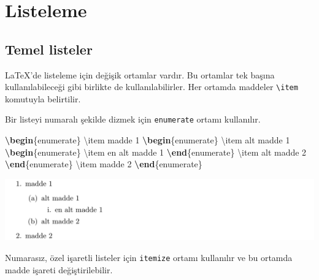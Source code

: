 \documentclass[
  10pt,
]{scrbook}
\newenvironment{Shaded}{}{}
\newcommand{\ExtensionTok}[1]{#1}
\newcommand{\FunctionTok}[1]{\textcolor[rgb]{0.02,0.16,0.49}{#1}}
\newcommand{\KeywordTok}[1]{\textcolor[rgb]{0.00,0.44,0.13}{\textbf{#1}}}
\newcommand{\NormalTok}[1]{#1}
\theoremstyle{definition}
\theoremstyle{definition}
\theoremstyle{definition}
\theoremstyle{definition}
\theoremstyle{remark}
\begin{document}
\hypertarget{listeleme}{%
\section{Listeleme}\label{listeleme}}

\hypertarget{temel-listeler}{%
\subsection{Temel listeler}\label{temel-listeler}}

LaTeX'de listeleme için değişik ortamlar vardır. Bu ortamlar tek başına kullanılabileceği gibi birlikte de kullanılabilirler. Her ortamda maddeler \texttt{\textbackslash{}item} komutuyla belirtilir.

Bir listeyi numaralı şekilde dizmek için \texttt{enumerate} ortamı kullanılır.

\begin{Shaded}
\begin{Highlighting}[]
\KeywordTok{\textbackslash{}begin}\NormalTok{\{}\ExtensionTok{enumerate}\NormalTok{\}}
 \FunctionTok{\textbackslash{}item}\NormalTok{ madde 1}
  \KeywordTok{\textbackslash{}begin}\NormalTok{\{}\ExtensionTok{enumerate}\NormalTok{\}}
    \FunctionTok{\textbackslash{}item}\NormalTok{ alt madde 1}
      \KeywordTok{\textbackslash{}begin}\NormalTok{\{}\ExtensionTok{enumerate}\NormalTok{\}}
        \FunctionTok{\textbackslash{}item}\NormalTok{ en alt madde 1}
      \KeywordTok{\textbackslash{}end}\NormalTok{\{}\ExtensionTok{enumerate}\NormalTok{\}}
    \FunctionTok{\textbackslash{}item}\NormalTok{ alt madde 2}
  \KeywordTok{\textbackslash{}end}\NormalTok{\{}\ExtensionTok{enumerate}\NormalTok{\}}
 \FunctionTok{\textbackslash{}item}\NormalTok{ madde 2}
\KeywordTok{\textbackslash{}end}\NormalTok{\{}\ExtensionTok{enumerate}\NormalTok{\}}
\end{Highlighting}
\end{Shaded}

\insvg

\includegraphics{examples/ex3.svg} \outsvg

Numarasız, özel işaretli listeler için \texttt{itemize} ortamı kullanılır ve bu ortamda madde işareti değiştirilebilir.
\end{document}
